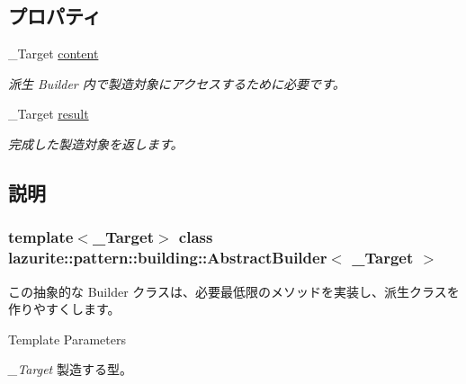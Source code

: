 \subsection*{プロパティ}
\begin{DoxyCompactItemize}
\item 
\_\-Target \hyperlink{classlazurite_1_1pattern_1_1building_1_1_abstract_builder_3_01___target_01_4_a6142f33993bb0d828922273209c1cb65}{content}
\begin{DoxyCompactList}\small\item\em 派生 Builder 内で製造対象にアクセスするために必要です。 \item\end{DoxyCompactList}\item 
\_\-Target \hyperlink{classlazurite_1_1pattern_1_1building_1_1_abstract_builder_3_01___target_01_4_a934a7ec1f51a62a61fb73998fbb2108a}{result}
\begin{DoxyCompactList}\small\item\em 完成した製造対象を返します。 \item\end{DoxyCompactList}\end{DoxyCompactItemize}


\subsection{説明}
\subsubsection*{template$<$\_\-Target$>$ class lazurite::pattern::building::AbstractBuilder$<$ \_\-Target $>$}

この抽象的な Builder クラスは、必要最低限のメソッドを実装し、派生クラスを作りやすくします。 
\begin{DoxyTemplParams}{Template Parameters}
\item[{\em \_\-Target}]製造する型。\end{DoxyTemplParams}


